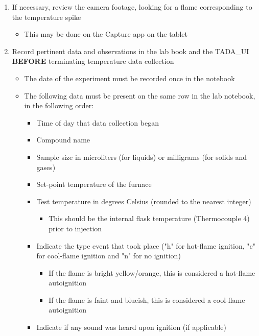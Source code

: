 \documentclass[letterpaper,11pt]{article}
\begin{document}
\begin{enumerate}
    \item If necessary, review the camera footage, looking for a flame 
        corresponding to the temperature spike
        \begin{itemize}
        \item This may be done on the Capture app on the tablet
        \end{itemize}
    
    \item Record pertinent data and observations in the lab book and 
        the TADA\_UI \textbf{BEFORE} terminating temperature data collection
        \begin{itemize}
        \item The date of the experiment must be recorded once in the notebook
        \item The following data must be present on the same row in the lab 
            notebook, in the following order:
            \begin{itemize}
            \item Time of day that data collection began
            \item Compound name 
            \item Sample size in microliters (for liquids) or milligrams
                (for solids and gases)
            \item Set-point temperature of the furnace
            \item Test temperature in degrees Celsius (rounded to the 
                nearest integer)
                \begin{itemize}
                \item This should be the internal flask temperature 
                    (Thermocouple 4) prior to injection
                \end{itemize}
            \item Indicate the type event that took place ("h" for hot-flame 
                ignition, "c" for cool-flame ignition and "n" for no ignition)
                \begin{itemize}
                \item If the flame is bright yellow/orange, this is considered a 
                    hot-flame autoignition
                \item If the flame is faint and blueish, this is considered a 
                    cool-flame autoignition
                \end{itemize}
            \item Indicate if any sound was heard upon ignition (if applicable)
            \end{itemize}
       

\end{itemize}
\end{enumerate}
\end{document}
